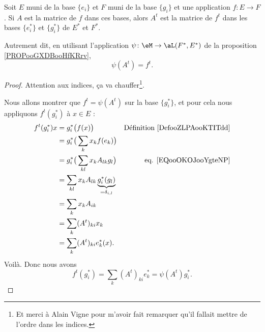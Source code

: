 \begin{lemma}       \label{LEMooEMNNooPquZMg}
	Soit \( E\) muni de la base \( \{ e_i \}\) et \( F\) muni de la base \( \{ g_i \}\) et une application \( f\colon E\to F\). Si \( A\) est la matrice de \( f\) dans ces bases, alors \( A^t\) est la matrice de \( f^t\) dans les bases \( \{ e^*_i \}\) et \( \{ g^*_i \}\) de \( E^*\) et \( F^*\).

	Autrement dit, en utilisant l'application \( \psi\colon \eM\to \aL(F^*,E^*)\) de la proposition \ref{PROPooGXDBooHfKRrv},
	\begin{equation}
		\psi(A^t)=f^t.
	\end{equation}
\end{lemma}

\begin{proof}
	Attention aux indices, ça va chauffer\footnote{Et merci à Alain Vigne pour m'avoir fait remarquer qu'il fallait mettre de l'ordre dans les indices.}.

	Nous allons montrer que \( f^t=\psi(A^t)\) sur la base \( \{ g_i^* \}\), et pour cela nous appliquons \( f^t(g_i^*)\) à \( x\in E\) :
	\begin{subequations}
		\begin{align}
			f^t(g_i^*)x & =g_i^*\big( f(x) \big)                                     & \text{Définition  \ref{DefooZLPAooKTITdd}} \\
			            & =g_i^*\big( \sum_kx_kf(e_k) \big)                                                                       \\
			            & =g_i^*\big( \sum_{kl}x_kA_{lk}g_l \big)                    & \text{eq. \eqref{EQooOKOJooYgteNP}}        \\
			            & =\sum_{kl}x_kA_{lk}\underbrace{g_i^*(g_l)}_{=\delta_{i,l}}                                              \\
			            & =\sum_kx_kA_{ik}                                                                                        \\
			            & =\sum_k(A^t)_{ki}x_k                                                                                    \\
			            & =\sum_k(A^t)_{ki}e^*_k(x).
		\end{align}
	\end{subequations}
	Voilà. Donc nous avons
	\begin{equation}
		f^t(g_i^*)=\sum_k(A^t)_{ki}e^*_k=\psi(A^t)g_i^*.
	\end{equation}
\end{proof}

